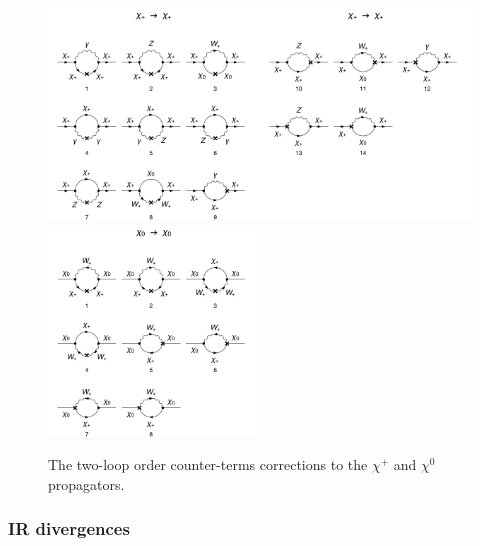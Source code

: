 \documentclass[11pt]{article}
\begin{document}
\begin{figure}[h!]
\center
\includegraphics[width=0.5\textwidth]{diagrams_F[1]_2c_1.pdf}\includegraphics[width=0.5\textwidth]{diagrams_F[1]_2c_2.pdf}
\includegraphics[width=0.5\textwidth]{diagrams_F[2]_2c.pdf}
\caption{The two-loop order counter-terms corrections to the $\chi^+$ and $\chi^0$ propagators.}\label{fig:chi_ct2}
\end{figure}

\clearpage

\subsubsection{IR divergences}
\end{document}
